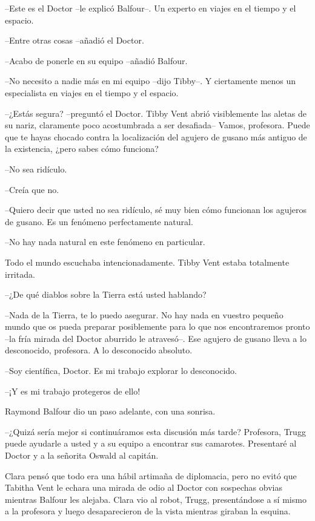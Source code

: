 {--Este es el Doctor --le explicó Balfour--. Un experto en viajes en el
tiempo y el espacio.}

{--Entre otras cosas --añadió el Doctor.}

{--Acabo de ponerle en su equipo --añadió Balfour.}

{--No necesito a nadie más en mi equipo --dijo Tibby--. Y ciertamente
menos un especialista en viajes en el tiempo y el espacio.}

{--¿Estás segura? --preguntó el Doctor. Tibby Vent abrió visiblemente las
 aletas de su nariz, claramente poco acostumbrada a ser desafiada--
 Vamos, profesora. Puede que te hayas chocado contra la localización del
 agujero de gusano más antiguo de la existencia, ¿pero sabes cómo
funciona?}

{--No sea ridículo.}

{--Creía que no.}

{--Quiero decir que usted no sea ridículo, sé muy bien cómo funcionan los
agujeros de gusano. Es un fenómeno perfectamente natural.}

{--No hay nada natural en este fenómeno en particular.}

{Todo el mundo escuchaba intencionadamente. Tibby Vent estaba totalmente
irritada.}

{--¿De qué diablos sobre la Tierra está usted hablando?}

{--Nada de la Tierra, te lo puedo asegurar. No hay nada en vuestro
 pequeño mundo que os pueda preparar posiblemente para lo que nos
 encontraremos pronto --la fría mirada del Doctor aburrido le atravesó--.
 Ese agujero de gusano lleva a lo desconocido, profesora. A lo
desconocido absoluto.}

{--Soy científica, Doctor. Es mi trabajo explorar lo desconocido.}

{--¡Y es mi trabajo protegeros de ello!}

{Raymond Balfour dio un paso adelante, con una sonrisa.}

{--¿Quizá sería mejor si continuáramos esta discusión más tarde?
 Profesora, Trugg puede ayudarle a usted y a su equipo a encontrar sus
camarotes. Presentaré al Doctor y a la señorita Oswald al capitán.}

{Clara pensó que todo era una hábil artimaña de diplomacia, pero no evitó
 que Tabitha Vent le echara una mirada de odio al Doctor con sospechas
 obvias mientras Balfour les alejaba. Clara vio al robot, Trugg,
 presentándose a sí mismo a la profesora y luego desaparecieron de la
vista mientras giraban la esquina.}

